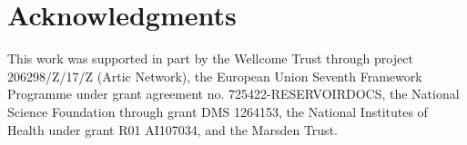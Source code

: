 \documentclass{bioinfo}
\begin{document}



\section*{Acknowledgments}

This work was supported in part by
the Wellcome Trust through project 206298/Z/17/Z (Artic Network),
the European Union Seventh Framework Programme under grant agreement no. 725422-RESERVOIRDOCS,
the National Science Foundation through grant DMS 1264153,
the National Institutes of Health under grant R01 AI107034,
and
the Marsden Trust.



\end{document}

